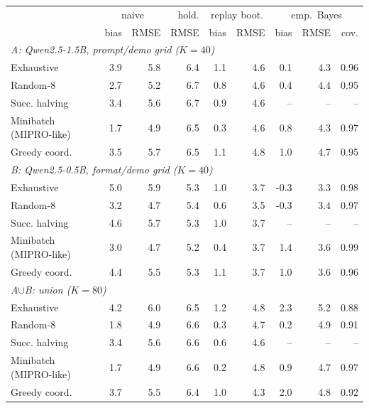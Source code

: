 \begin{tabular}{lrrrrrrrr}\toprule
\multicolumn{1}{l}{} & \multicolumn{2}{c}{naive} & hold. & \multicolumn{2}{c}{replay boot.} & \multicolumn{3}{c}{emp.\ Bayes} \\
 & bias & RMSE & RMSE & bias & RMSE & bias & RMSE & cov. \\\midrule
\multicolumn{9}{l}{\emph{A: Qwen2.5-1.5B, prompt/demo grid ($K{=}40$)}} \\
Exhaustive & 3.9 & 5.8 & 6.4 & 1.1 & 4.6 & 0.1 & 4.3 & 0.96 \\
Random-8 & 2.7 & 5.2 & 6.7 & 0.8 & 4.6 & 0.4 & 4.4 & 0.95 \\
Succ. halving & 3.4 & 5.6 & 6.7 & 0.9 & 4.6 & -- & -- & -- \\
Minibatch (MIPRO-like) & 1.7 & 4.9 & 6.5 & 0.3 & 4.6 & 0.8 & 4.3 & 0.97 \\
Greedy coord. & 3.5 & 5.7 & 6.5 & 1.1 & 4.8 & 1.0 & 4.7 & 0.95 \\
\multicolumn{9}{l}{\emph{B: Qwen2.5-0.5B, format/demo grid ($K{=}40$)}} \\
Exhaustive & 5.0 & 5.9 & 5.3 & 1.0 & 3.7 & -0.3 & 3.3 & 0.98 \\
Random-8 & 3.2 & 4.7 & 5.4 & 0.6 & 3.5 & -0.3 & 3.4 & 0.97 \\
Succ. halving & 4.6 & 5.7 & 5.3 & 1.0 & 3.7 & -- & -- & -- \\
Minibatch (MIPRO-like) & 3.0 & 4.7 & 5.2 & 0.4 & 3.7 & 1.4 & 3.6 & 0.99 \\
Greedy coord. & 4.4 & 5.5 & 5.3 & 1.1 & 3.7 & 1.0 & 3.6 & 0.96 \\
\multicolumn{9}{l}{\emph{A$\cup$B: union ($K{=}80$)}} \\
Exhaustive & 4.2 & 6.0 & 6.5 & 1.2 & 4.8 & 2.3 & 5.2 & 0.88 \\
Random-8 & 1.8 & 4.9 & 6.6 & 0.3 & 4.7 & 0.2 & 4.9 & 0.91 \\
Succ. halving & 3.4 & 5.6 & 6.6 & 0.6 & 4.6 & -- & -- & -- \\
Minibatch (MIPRO-like) & 1.7 & 4.9 & 6.6 & 0.2 & 4.8 & 0.9 & 4.7 & 0.97 \\
Greedy coord. & 3.7 & 5.5 & 6.4 & 1.0 & 4.3 & 2.0 & 4.8 & 0.92 \\
\bottomrule
\end{tabular}

